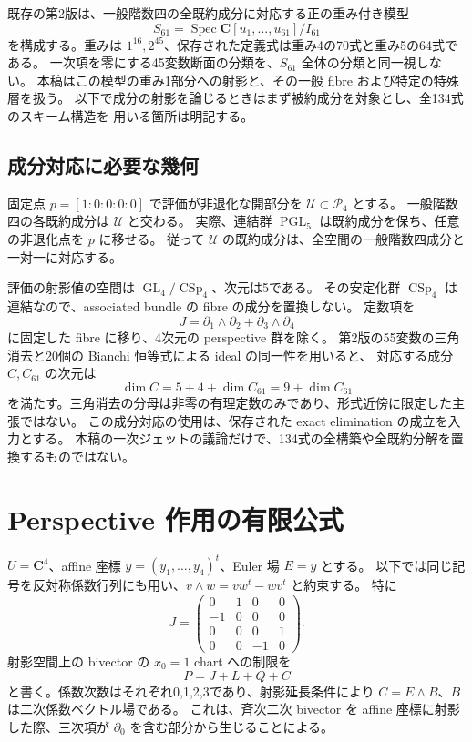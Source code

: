 \documentclass[11pt,a4paper]{ltjsarticle}
\newcommand{\CC}{\mathbf C}
\newcommand{\cP}{\mathcal P_4}
\DeclareMathOperator{\CSp}{CSp}
\DeclareMathOperator{\GL}{GL}
\DeclareMathOperator{\PGL}{PGL}
\DeclareMathOperator{\Spec}{Spec}
\theoremstyle{remark}
\begin{document}
既存の第2版\cite{v2}は、一般階数四の全既約成分に対応する正の重み付き模型
\[
 S_{61}=\Spec\CC[u_1,\ldots,u_{61}]/I_{61}
\]
を構成する。重みは $1^{16},2^{45}$、保存された定義式は重み4の70式と重み5の64式である。
一次項を零にする45変数断面の分類を、$S_{61}$ 全体の分類と同一視しない。
本稿はこの模型の重み1部分への射影と、その一般 fibre および特定の特殊層を扱う。
以下で成分の射影を論じるときはまず被約成分を対象とし、全134式のスキーム構造を
用いる箇所は明記する。

\subsection{成分対応に必要な幾何}
固定点 $p=[1:0:0:0:0]$ で評価が非退化な開部分を $\mathcal U\subset\cP$ とする。
一般階数四の各既約成分は $\mathcal U$ と交わる。
実際、連結群 $\PGL_5$ は既約成分を保ち、任意の非退化点を $p$ に移せる。
従って $\mathcal U$ の既約成分は、全空間の一般階数四成分と一対一に対応する。

評価の射影値の空間は $\GL_4/\CSp_4$、次元は5である。
その安定化群 $\CSp_4$ は連結なので、associated bundle の fibre の成分を置換しない。
定数項を
\[
 J=\partial_1\wedge\partial_2+\partial_3\wedge\partial_4
\]
に固定した fibre に移り、4次元の perspective 群を除く。
第2版の55変数の三角消去と20個の Bianchi 恒等式による ideal の同一性を用いると、
対応する成分 $C,C_{61}$ の次元は
\[
 \dim C=5+4+\dim C_{61}=9+\dim C_{61}
\]
を満たす。三角消去の分母は非零の有理定数のみであり、形式近傍に限定した主張ではない。
この成分対応の使用は、保存された exact elimination の成立を入力とする。
本稿の一次ジェットの議論だけで、134式の全構築や全既約分解を置換するものではない。

\section{Perspective 作用の有限公式}
$U=\CC^4$、affine 座標 $y=(y_1,\ldots,y_4)^t$、Euler 場 $E=y$ とする。
以下では同じ記号を反対称係数行列にも用い、$v\wedge w=vw^t-wv^t$ と約束する。
特に
\[
 J=\begin{pmatrix}0&1&0&0\\-1&0&0&0\\0&0&0&1\\0&0&-1&0\end{pmatrix}.
\]
射影空間上の bivector の $x_0=1$ chart への制限を
\begin{equation}\label{eq:decomposition}
 P=J+L+Q+C
\end{equation}
と書く。係数次数はそれぞれ0,1,2,3であり、射影延長条件により
$C=E\wedge B$、$B$ は二次係数ベクトル場である。
これは、斉次二次 bivector を affine 座標に射影した際、三次項が
$\partial_0$ を含む部分から生じることによる。
\end{document}
